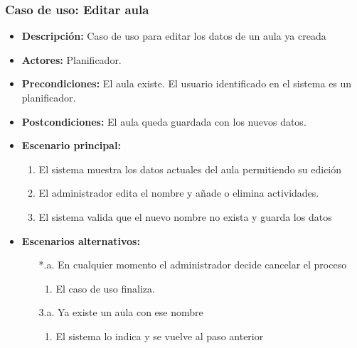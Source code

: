 \subsubsection*{Caso de uso: Editar aula}
\begin{itemize}
\item{\bf Descripción:} Caso de uso para editar los datos de un aula ya creada
\item{\bf Actores:} Planificador.
\item{\bf Precondiciones:} El aula existe. El usuario identificado en el sistema es un planificador.
\item{\bf Postcondiciones:} El aula queda guardada con los nuevos datos.
\item{\bf Escenario principal:}
	\begin{enumerate}
	\item El sistema muestra los datos actuales del aula permitiendo su edición
	\item El administrador edita el nombre y añade o elimina actividades.
	\item El sistema valida que el nuevo nombre no exista y guarda los datos
	\end{enumerate}
\item{\bf Escenarios alternativos:}
	\begin{itemize}
		\item[*.a.] En cualquier momento el administrador decide cancelar el proceso
		\begin{enumerate}
			\item El caso de uso finaliza.
		\end{enumerate}
		\item[3.a.] Ya existe un aula con ese nombre
		\begin{enumerate}
			\item El sistema lo indica y se vuelve al paso anterior
		\end{enumerate}
	\end{itemize}
\end{itemize}



